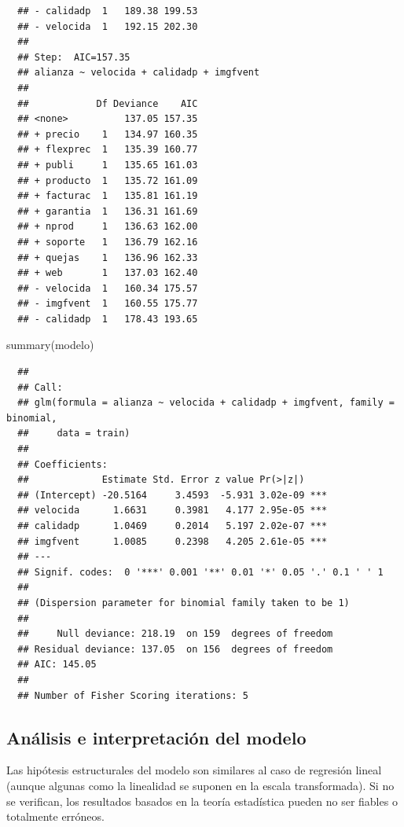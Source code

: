 \documentclass[
]{book}
\newenvironment{Shaded}{\begin{snugshade}}{\end{snugshade}}
\newcommand{\FunctionTok}[1]{\textcolor[rgb]{0.00,0.00,0.00}{#1}}
\newcommand{\NormalTok}[1]{#1}
\theoremstyle{break}
\theoremstyle{nonumberplain}
\begin{document}
\begin{verbatim}
  ## - calidadp  1   189.38 199.53
  ## - velocida  1   192.15 202.30
  ## 
  ## Step:  AIC=157.35
  ## alianza ~ velocida + calidadp + imgfvent
  ## 
  ##            Df Deviance    AIC
  ## <none>          137.05 157.35
  ## + precio    1   134.97 160.35
  ## + flexprec  1   135.39 160.77
  ## + publi     1   135.65 161.03
  ## + producto  1   135.72 161.09
  ## + facturac  1   135.81 161.19
  ## + garantia  1   136.31 161.69
  ## + nprod     1   136.63 162.00
  ## + soporte   1   136.79 162.16
  ## + quejas    1   136.96 162.33
  ## + web       1   137.03 162.40
  ## - velocida  1   160.34 175.57
  ## - imgfvent  1   160.55 175.77
  ## - calidadp  1   178.43 193.65
\end{verbatim}

\begin{Shaded}
\begin{Highlighting}[]
\FunctionTok{summary}\NormalTok{(modelo)}
\end{Highlighting}
\end{Shaded}

\begin{verbatim}
  ## 
  ## Call:
  ## glm(formula = alianza ~ velocida + calidadp + imgfvent, family = binomial, 
  ##     data = train)
  ## 
  ## Coefficients:
  ##             Estimate Std. Error z value Pr(>|z|)    
  ## (Intercept) -20.5164     3.4593  -5.931 3.02e-09 ***
  ## velocida      1.6631     0.3981   4.177 2.95e-05 ***
  ## calidadp      1.0469     0.2014   5.197 2.02e-07 ***
  ## imgfvent      1.0085     0.2398   4.205 2.61e-05 ***
  ## ---
  ## Signif. codes:  0 '***' 0.001 '**' 0.01 '*' 0.05 '.' 0.1 ' ' 1
  ## 
  ## (Dispersion parameter for binomial family taken to be 1)
  ## 
  ##     Null deviance: 218.19  on 159  degrees of freedom
  ## Residual deviance: 137.05  on 156  degrees of freedom
  ## AIC: 145.05
  ## 
  ## Number of Fisher Scoring iterations: 5
\end{verbatim}

\hypertarget{analisis-glm}{%
\subsection{Análisis e interpretación del modelo}\label{analisis-glm}}

Las hipótesis estructurales del modelo son similares al caso de regresión lineal (aunque algunas como la linealidad se suponen en la escala transformada).
Si no se verifican, los resultados basados en la teoría estadística pueden no ser fiables o totalmente erróneos.
\end{document}
